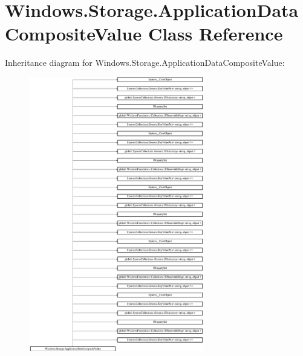 \hypertarget{class_windows_1_1_storage_1_1_application_data_composite_value}{}\section{Windows.\+Storage.\+Application\+Data\+Composite\+Value Class Reference}
\label{class_windows_1_1_storage_1_1_application_data_composite_value}
Inheritance diagram for Windows.\+Storage.\+Application\+Data\+Composite\+Value\+:\begin{figure}[H]
\begin{center}
\leavevmode
\includegraphics[height=12.000000cm]{class_windows_1_1_storage_1_1_application_data_composite_value}
\end{center}
\end{figure}
